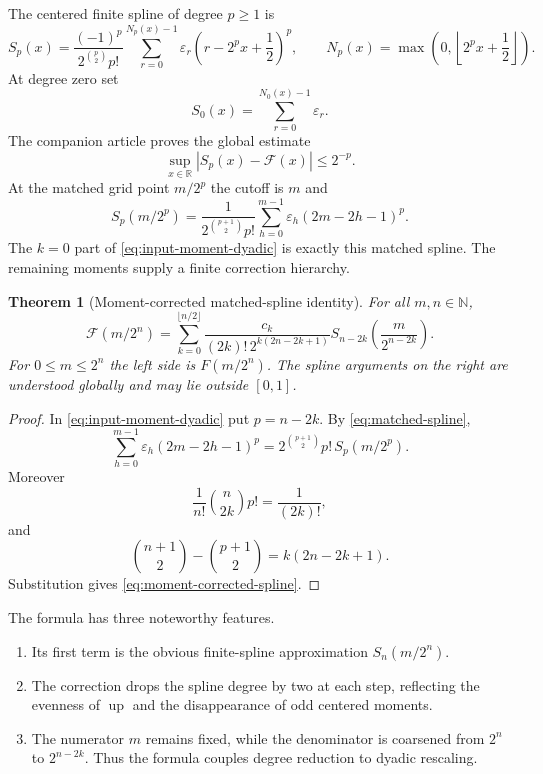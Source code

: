 \documentclass[11pt,oneside]{article}
\newtheorem{theorem}{Theorem}[section]
\theoremstyle{definition}
\theoremstyle{remark}
\newcommand{\R}{\mathbb R}
\newcommand{\N}{\mathbb N}
\newcommand{\Up}{\operatorname{up}}
\newcommand{\tm}{\varepsilon}
\begin{document}
The centered finite spline of degree $p\ge1$ is
\begin{equation}
 S_p(x)=\frac{(-1)^p}{2^{\binom p2}p!}
 \sum_{r=0}^{N_p(x)-1}\tm_r\left(r-2^px+\frac12\right)^p,
 \qquad
 N_p(x)=\max\!\left(0,\left\lfloor2^px+\frac12\right\rfloor\right). \label{eq:centered-spline-local}
\end{equation}
At degree zero set
\begin{equation}
 S_0(x)=\sum_{r=0}^{N_0(x)-1}\tm_r.                        \label{eq:S0-local}
\end{equation}
The companion article proves the global estimate
\begin{equation}
 \sup_{x\in\R}|S_p(x)-\mathcal F(x)|\le2^{-p}.             \label{eq:centered-global-error-input}
\end{equation}
At the matched grid point $m/2^p$ the cutoff is $m$ and
\begin{equation}
 S_p(m/2^p)=\frac{1}{2^{\binom{p+1}{2}}p!}
 \sum_{h=0}^{m-1}\tm_h(2m-2h-1)^p.                       \label{eq:matched-spline}
\end{equation}
The $k=0$ part of \eqref{eq:input-moment-dyadic} is exactly this matched spline.  The remaining
moments supply a finite correction hierarchy.

\begin{theorem}[Moment-corrected matched-spline identity]
\label{thm:moment-corrected-spline}
For all $m,n\in\N$,
\begin{equation}
 \boxed{
 \mathcal F(m/2^n)=
 \sum_{k=0}^{\lfloor n/2\rfloor}
 \frac{c_k}{(2k)!\,2^{k(2n-2k+1)}}
 S_{n-2k}\!\left(\frac{m}{2^{n-2k}}\right).}              \label{eq:moment-corrected-spline}
\end{equation}
For $0\le m\le2^n$ the left side is $F(m/2^n)$.  The spline arguments on the right are
understood globally and may lie outside $[0,1]$.
\end{theorem}

\begin{proof}
In \eqref{eq:input-moment-dyadic} put $p=n-2k$.  By
\eqref{eq:matched-spline},
\[
 \sum_{h=0}^{m-1}\tm_h(2m-2h-1)^p
 =2^{\binom{p+1}{2}}p!\,S_p(m/2^p).
\]
Moreover
\[
 \frac1{n!}\binom n{2k}p!=\frac1{(2k)!},
\]
and
\[
 \binom{n+1}{2}-\binom{p+1}{2}=k(2n-2k+1).
\]
Substitution gives \eqref{eq:moment-corrected-spline}.
\end{proof}

The formula has three noteworthy features.
\begin{enumerate}
\item Its first term is the obvious finite-spline approximation $S_n(m/2^n)$.
\item The correction drops the spline degree by two at each step, reflecting the evenness of
      $\Up$ and the disappearance of odd centered moments.
\item The numerator $m$ remains fixed, while the denominator is coarsened from $2^n$ to
      $2^{n-2k}$.  Thus the formula couples degree reduction to dyadic rescaling.
\end{enumerate}
\end{document}
